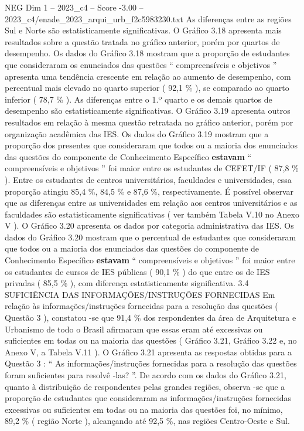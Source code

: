 \begin{textsample}{NEG Dim 1 – 2023\_c4 – Score -3.00 – 2023\_c4/enade\_2023\_arqui\_urb\_f2c5983230.txt}
As diferenças entre as regiões Sul e Norte são estatisticamente significativas.
O Gráfico 3.18 apresenta mais resultados sobre a questão tratada no gráfico anterior, porém por quartos de desempenho.
Os dados do Gráfico 3.18 mostram que a proporção de estudantes que consideraram os enunciados das questões “ compreensíveis e objetivos ” apresenta uma tendência crescente em relação ao aumento de desempenho, com percentual mais elevado no quarto superior ( 92,1 \% ), se comparado ao quarto inferior ( 78,7 \% ).
As diferenças entre o 1.º quarto e os demais quartos de desempenho são estatisticamente significativas.
O Gráfico 3.19 apresenta outros resultados em relação à mesma questão retratada no gráfico anterior, porém por organização acadêmica das IES.
Os dados do Gráfico 3.19 mostram que a proporção dos presentes que consideraram que todos ou a maioria dos enunciados das questões do componente de Conhecimento Específico \textbf{estavam} “ compreensíveis e objetivos ” foi maior entre os estudantes de CEFET/IF ( 87,8 \% ).
Entre os estudantes de centros universitários, faculdades e universidades, essa proporção atingiu 85,4 \%, 84,5 \% e 87,6 \%, respectivamente.
É possível observar que as diferenças entre as universidades em relação aos centros universitários e as faculdades são estatisticamente significativas ( ver também Tabela V.10 no Anexo V ).
O Gráfico 3.20 apresenta os dados por categoria administrativa das IES.
Os dados do Gráfico 3.20 mostram que o percentual de estudantes que consideraram que todos ou a maioria dos enunciados das questões do componente de Conhecimento Específico \textbf{estavam} “ compreensíveis e objetivos ” foi maior entre os estudantes de cursos de IES públicas ( 90,1 \% ) do que entre os de IES privadas ( 85,5 \% ), com diferença estatisticamente significativa. 3.4 SUFICIÊNCIA DAS INFORMAÇÕES/INSTRUÇÕES FORNECIDAS Em relação às informações/instruções fornecidas para a resolução das questões ( Questão 3 ), constatou -se que 91,4 \% dos respondentes da área de Arquitetura e Urbanismo de todo o Brasil afirmaram que essas eram até excessivas ou suficientes em todas ou na maioria das questões ( Gráfico 3.21, Gráfico 3.22 e, no Anexo V, a Tabela V.11 ).
O Gráfico 3.21 apresenta as respostas obtidas para a Questão 3 : “ As informações/instruções fornecidas para a resolução das questões foram suficientes para resolvê -las? ”.
De acordo com os dados do Gráfico 3.21, quanto à distribuição de respondentes pelas grandes regiões, observa -se que a proporção de estudantes que consideraram as informações/instruções fornecidas excessivas ou suficientes em todas ou na maioria das questões foi, no mínimo, 89,2 \% ( região Norte ), alcançando até 92,5 \%, nas regiões Centro-Oeste e Sul.

\end{textsample}

